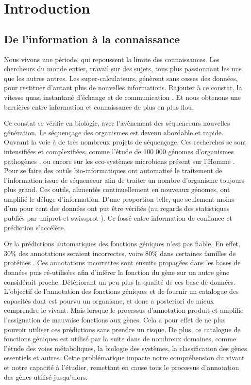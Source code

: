 \chapter{Introduction}
\section{De l'information à la connaissance}
Nous vivons une période, qui repoussent la limite des connaissances. Les chercheurs du monde entier, travail sur des sujets, tous plus passionnant les uns que les autres autres. Les super-calculateurs, génèrent sans cesses des données, pour restituer d'autant plus de nouvelles informations. Rajouter à ce constat, la vitesse quasi instantané d'échange et de communication . Et nous obtenons une barrières entre information et connaissance de plus en plus flou.

Ce constat se vérifie en biologie, avec l'avènement des séquenceurs nouvelles génération. Le séquençage des organismes est devenu abordable et rapide. Ouvrant la voie à de très nombreux projets de séquençage. Ces recherches se sont intensifiées et complexifiées, comme l'étude de 100 000 génomes d'organismes pathogènes \cite{100kfoodborne}, ou encore sur les eco-systèmes microbiens présent sur l'Homme \cite{hmp}. Pour se faire des outils bio-informatiques ont automatisé le traitement de l'information issue de séquenceur afin de traiter un nombre d'organisme toujours plus grand. Ces outils, alimentés continuellement en nouveaux génomes, ont amplifié le déluge d'information. D'une proportion telle, que seulement moins d'un pour cent des données ont put être vérifiés (au regards des statistiques publiés par uniprot et swissprot \parencites{uniprot_stat}{expasy_stat} ). Ce fossé entre information de confiance et prédiction s'accélère.

Or la prédictions automatiques des fonctions géniques n'est pas fiable. En effet, 30\% des annotations seraient incorrectes, voire 80\% dans certaines familles de protéines \parencites{devos2001intrinsic}{schnoes2009annotation}. Ces annotations incorrectes sont ensuite propagées dans les bases de données puis ré-utilisées afin d'inférer la fonction du gène sur un autre  gène considérait proche. Détériorant un peu plus la qualité de ces base de données.
L'objectif de l'annotation des fonctions géniques et de fournir un catalogue des capacités dont est pourvu un organisme, et donc a posteriori de mieux comprendre le vivant. Mais lorsque le processus d'annotation produit et amplifie l'assignation de mauvaise fonctions aux gènes. Cela a pour effet de ne plus pouvoir utiliser ces prédictions sans prendre un risque. De plus, ce catalogue de fonctions géniques est utilisé par la suite dans de nombreux domaines, comme l'étude des voies métaboliques, la biologie des systèmes, la classification des gènes essentiels et autres. Cette problématique impacte notre compréhension du vivant et notre capacité à l'étudier, remettant en cause tous le processus d'annotation des gènes utilisé jusqu'alors. 



